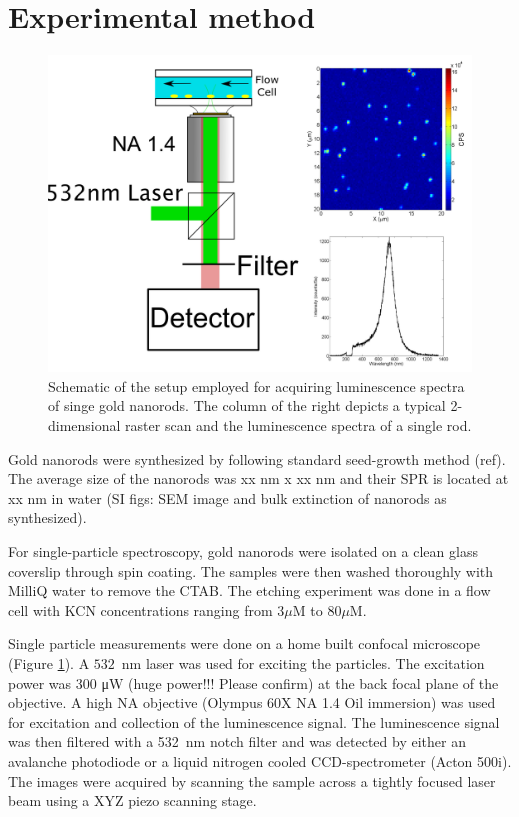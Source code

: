 \documentclass{article}
\begin{document}
\section{Experimental method}
\begin{figure}[p]
 \centering
 \includegraphics[width=0.95\linewidth]{Figures/Setup/setup_1.png}
 \caption{Schematic of the setup employed for acquiring luminescence spectra of
 singe gold nanorods. The column of the right depicts a typical
 2-dimensional raster scan and the luminescence spectra of a single rod.}
 \label{fig:setup}
\end{figure}

Gold nanorods were synthesized by following standard seed-growth method (ref).
The average size of the nanorods was xx nm x xx nm and their SPR is located at
xx nm in water (SI figs: SEM image and bulk extinction of nanorods as
synthesized).

For single-particle spectroscopy, gold nanorods were isolated on a clean glass
coverslip through spin coating. The samples were then washed thoroughly with
MilliQ water to remove the CTAB. The etching experiment was done in a flow cell
with KCN concentrations ranging from $3\mu\textrm{M}$ to $80\mu\textrm{M}$.

Single particle measurements were done on a home built confocal microscope
(Figure \ref{fig:setup}). A $532$ nm laser was used for exciting the particles.
The excitation power was 300 μW (huge power!!! Please confirm) at the back focal plane of the
objective. A high NA objective (Olympus 60X NA 1.4 Oil immersion) was used for
excitation and collection of the luminescence signal. The luminescence signal
was then filtered with a 532 nm notch filter and was detected by either an
avalanche photodiode or a liquid nitrogen cooled CCD-spectrometer (Acton 500i).
The images were acquired by scanning the sample across a tightly focused laser
beam using a XYZ piezo scanning stage.
\end{document}
